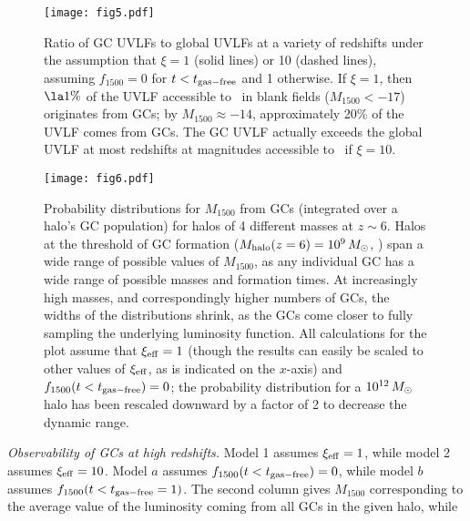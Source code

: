 \documentclass[fleqn,usenatbib]{mnras}
\newcommand{\xieff}{\xi_{\rm eff}}
\newcommand{\fescobs}{f_{1500}}
\newcommand{\tgasfree}{t_{\rm gas-free}}
\begin{document}
{%
\begin{figure}
 \centering
\texttt{[image: fig5.pdf]}
\caption{Ratio of GC UVLFs to global UVLFs at a variety of redshifts under the
  assumption that $\xi=1$ (solid lines) or 10 (dashed lines), assuming
  $\fescobs=0$ for $t<\tgasfree$ and 1 otherwise. If $\xi=1$, then 
  $\la 1\%$ of the UVLF accessible to \hst\ in blank fields ($M_{1500} < -17$)
  originates from GCs; by $M_{1500} \approx -14$, approximately 20\% of the UVLF
  comes from GCs. The GC UVLF actually exceeds the global UVLF at most redshifts
  at magnitudes accessible to \hst\ if $\xi=10$.
 \label{fig:ratio_obs_vs_fink}
}
\end{figure}
\begin{figure}
 \centering
 \texttt{[image: fig6.pdf]}
 \caption{Probability distributions for $M_{1500}$ from GCs (integrated over a
   halo's GC population) for halos of 4 different masses at $z\sim6$. Halos at the
   threshold of GC formation ($M_{\rm halo}(z=6)=10^{9}\,M_{\odot}$,
   ) span a wide range of possible values of
   $M_{1500}$, as any individual GC has a wide range of possible masses and
   formation times. At increasingly high masses, and correspondingly higher
   numbers of GCs, the widths of the distributions shrink, as the GCs come
   closer to fully sampling the underlying luminosity function. All calculations
   for the plot assume that $\xieff=1$ (though the results can easily be scaled
   to other values of $\xieff$, as is indicated on the $x$-axis) and
   $\fescobs (t< \tgasfree)=0$; the probability distribution for a
   $10^{12}\,M_{\odot}$ halo has been rescaled downward by a factor of 2 to decrease
   the dynamic range.
 \label{fig:montecarlo}
}
\end{figure}
\begin{table}
\renewcommand{\arraystretch}{1.4}
\setlength{\tabcolsep}{6pt}
\caption{\textit{Observability of GCs at high redshifts.} Model 1 assumes
  $\xieff=1$, while model 2 assumes $\xieff=10$. Model $a$ assumes 
  $\fescobs (t<\tgasfree)=0$, while model $b$ assumes $\fescobs
  (t<\tgasfree=1)$. The second column gives $M_{1500}$ corresponding to the
  average value of the luminosity coming from all GCs in the given halo, while
}
\end{table}}
\end{document}
